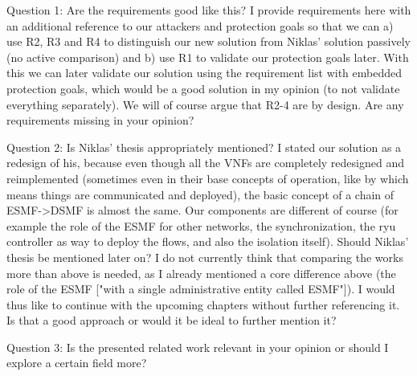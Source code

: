 Question 1: Are the requirements good like this? I provide requirements here with an additional reference to our attackers and protection goals so that we can a) use R2, R3 and R4 to distinguish our new solution from Niklas' solution passively (no active comparison) and b) use R1 to validate our protection goals later. With this we can later validate our solution using the requirement list with embedded protection goals, which would be a good solution in my opinion (to not validate everything separately). We will of course argue that R2-4 are by design. Are any requirements missing in your opinion?  

Question 2: Is Niklas' thesis appropriately mentioned? I stated our solution as a redesign of his, because even though all the VNFs are completely redesigned and reimplemented (sometimes even in their base concepts of operation, like by which means things are communicated and deployed), the basic concept of a chain of ESMF->DSMF is almost the same. Our components are different of course (for example the role of the ESMF for other networks, the synchronization, the ryu controller as way to deploy the flows, and also the isolation itself). Should Niklas' thesis be mentioned later on? I do not currently think that comparing the works more than above is needed, as I already mentioned a core difference above (the role of the ESMF ["with a single administrative entity called ESMF"]). I would thus like to continue with the upcoming chapters without further referencing it. Is that a good approach or would it be ideal to further mention it?  

Question 3: Is the presented related work relevant in your opinion or should I explore a certain field more?  